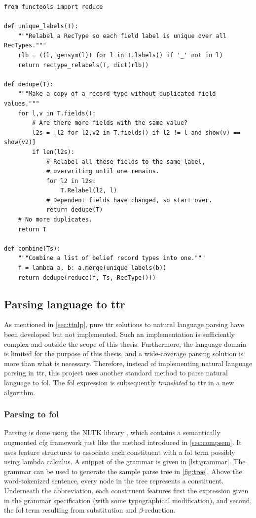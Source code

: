 \begin{lstlisting}[label={lst:combine}, caption=The \texttt{combine} and \texttt{dedupe} functions.]
from functools import reduce

def unique_labels(T):
    """Relabel a RecType so each field label is unique over all RecTypes."""
    rlb = ((l, gensym(l)) for l in T.labels() if '_' not in l)
    return rectype_relabels(T, dict(rlb))

def dedupe(T):
    """Make a copy of a record type without duplicated field values."""
    for l,v in T.fields():
        # Are there more fields with the same value?
        l2s = [l2 for l2,v2 in T.fields() if l2 != l and show(v) == show(v2)]
        if len(l2s):
            # Relabel all these fields to the same label,
			# overwriting until one remains.
            for l2 in l2s:
                T.Relabel(l2, l)
            # Dependent fields have changed, so start over.
            return dedupe(T)
    # No more duplicates.
    return T

def combine(Ts):
    """Combine a list of belief record types into one."""
    f = lambda a, b: a.merge(unique_labels(b))
    return dedupe(reduce(f, Ts, RecType()))
\end{lstlisting}



\subsection{Parsing language to \gls{ttr}}
\label{sec:parsing}

As mentioned in \autoref{sec:ttnlp}, pure \gls{ttr} solutions to natural language parsing have been developed but not implemented.
Such an implementation is sufficiently complex and outside the scope of this thesis.
Furthermore, the language domain is limited for the purpose of this thesis, and a wide-coverage parsing solution is more than what is necessary.
Therefore, instead of implementing natural language parsing in \gls{ttr}, this project uses
another standard method to parse natural language to \gls{fol}.
The \gls{fol} expression is subsequently \textit{translated} to \gls{ttr} in a new algorithm.

\subsubsection{Parsing to \gls{fol}}

Parsing is done using the NLTK library \citep{nltk}, which contains a semantically augmented \gls{cfg} framework just like the method introduced in \autoref{sec:compsem}.
It uses feature structures to associate each constituent with a \gls{fol} term possibly using lambda calculus.
A snippet of the grammar is given in \autoref{lst:grammar}.
The grammar can be used to generate the sample parse tree in \autoref{fig:tree}.
Above the word-tokenized sentence, every node in the tree represents a constituent.
Underneath the abbreviation, each constituent features first the expression given in the grammar specification (with some typographical modification), and second, the \gls{fol} term resulting from substitution and $\beta$-reduction.

